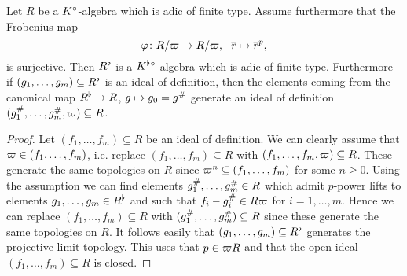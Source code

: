 \begin{lemma}
Let $R$ be a $K{^{\circ}}$-algebra which is adic of finite type.
Assume  furthermore that the Frobenius map 
\[\varphi\colon R/\varpi \to R/\varpi,\:\:\:\overline{r}\mapsto \overline{r}^p,\]
is surjective.
Then $R^{\flat}$ is a $K^{\flat}{^{\circ}}$-algebra which is adic of finite type. %
Furthermore if $(g_1,\dots,g_m)\subseteq R^{\flat}$ is an ideal of definition, then the elements coming from the canonical map $R^{\flat}\to R$, $g\mapsto g_0 = g^{\#}$ generate an ideal of definition 
$(g_1^{\#},\dots,g_m^{\#},\varpi)\subseteq R$.
\end{lemma}
\begin{proof}
Let $(f_1,\dots,f_m)\subseteq R$ be an ideal of definition. We can clearly assume that $\varpi\in(f_1,\dots,f_m)$, i.e. replace 
$(f_1,\dots,f_m)\subseteq R$ with $(f_1,\dots,f_m, \varpi)\subseteq R$. These generate the same topologies on $R$ since
$\varpi^n\subseteq(f_1,\dots,f_m)$ for some $n\geq0$.
Using the assumption we can find elements $g_1^{\#},\dots,g_m^{\#}\in R$ which admit $p$-power lifts to elements 
$g_1,\dots,g_m\in R^{\flat}$ and such that $f_i-g_i^{\#}\in R\varpi$ for $i=1,\dots,m$. Hence we can replace 
$(f_1,\dots,f_m)\subseteq R$ with $(g_1^{\#},\dots,g_m^{\#})\subseteq R$ since these generate the same topologies on $R$. It follows easily that $(g_1,\dots,g_m)\subseteq R^{\flat}$ generates the projective limit topology. This uses that
$p\in\varpi R$ and that the open ideal $(f_1,\dots,f_m)\subseteq R$ is closed.
\end{proof}

